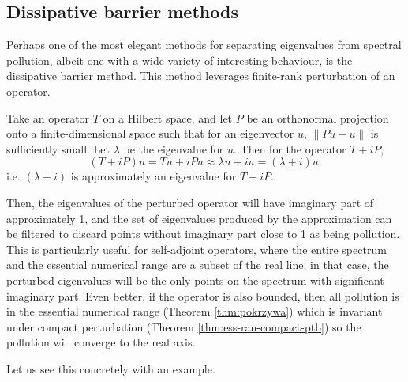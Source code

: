 \documentclass[../main.tex]{subfiles}
\begin{document}
\subsection{Dissipative barrier methods}
\label{sec:dissipative-barrier}
Perhaps one of the most elegant methods for separating eigenvalues from spectral
pollution, albeit one with a wide variety of interesting behaviour,
is the dissipative barrier method. This method leverages finite-rank
perturbation of an operator.

Take an operator $T$ on a Hilbert space, and let $P$ be an orthonormal
projection onto a finite-dimensional space  such that for an eigenvector $u$,
$\|Pu - u\|$ is sufficiently small. Let $\lambda$ be the eigenvalue for $u$.
Then for the operator $T+iP$,
$$(T+iP) u = Tu + iPu \approx \lambda u + iu = (\lambda + i)u.$$
i.e. $(\lambda + i)$ is approximately an eigenvalue for $T+iP$. 

Then, the eigenvalues of the perturbed operator will have imaginary part of
approximately 1, and the set of eigenvalues produced by the approximation can be
filtered to discard points without imaginary part close to 1 as being pollution.
This is particularly useful for self-adjoint operators, where the entire
spectrum and the essential numerical range are a subset of the real line; in
that case, the perturbed eigenvalues will be the only points on the spectrum
with significant imaginary part. Even better, if the operator is also bounded,
then all pollution is in the essential numerical range (Theorem \ref{thm:pokrzywa}) which is
invariant under compact perturbation (Theorem \ref{thm:ess-ran-compact-ptb}) so the pollution will
converge to the real axis.

Let us see this concretely with an example.
\end{document}
